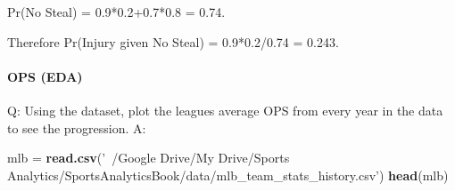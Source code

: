 \documentclass[]{article}
\newenvironment{Shaded}{\begin{snugshade}}{\end{snugshade}}
\newcommand{\KeywordTok}[1]{\textcolor[rgb]{0.13,0.29,0.53}{\textbf{#1}}}
\newcommand{\NormalTok}[1]{#1}
\newcommand{\StringTok}[1]{\textcolor[rgb]{0.31,0.60,0.02}{#1}}
\let\oldparagraph\paragraph
\renewcommand{\paragraph}[1]{\oldparagraph{#1}\mbox{}}
\begin{document}
Pr(No Steal) = 0.9*0.2+0.7*0.8 = 0.74.

Therefore Pr(Injury given No Steal) = 0.9*0.2/0.74 = 0.243.

\hypertarget{ops-eda}{%
\paragraph{OPS (EDA)}\label{ops-eda}}

Q: Using the dataset, plot the leagues average OPS from every year in
the data to see the progression. A:

\begin{Shaded}
\begin{Highlighting}[]
\NormalTok{mlb =}\StringTok{ }\KeywordTok{read.csv}\NormalTok{(}\StringTok{'~/Google Drive/My Drive/Sports Analytics/SportsAnalyticsBook/data/mlb_team_stats_history.csv'}\NormalTok{)}
\KeywordTok{head}\NormalTok{(mlb)}
\end{Highlighting}
\end{Shaded}
\end{document}

